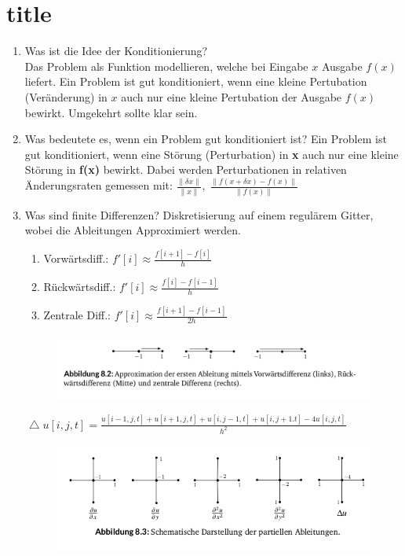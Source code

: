 \documentclass[10pt,a4paper,titlepage]{article}
\begin{document}
\section{title}
\begin{enumerate}[resume=b]
	\item Was ist die Idee der Konditionierung? \\
        Das Problem als Funktion modellieren, welche bei Eingabe $x$ Ausgabe $f(x)$ liefert. Ein Problem ist gut konditioniert, wenn eine kleine Pertubation (Veränderung) in $x$ auch nur eine kleine Pertubation der Ausgabe $f(x)$ bewirkt. Umgekehrt sollte klar sein.

	\item Was bedeutete es, wenn ein Problem gut konditioniert ist?\newline
	Ein Problem ist gut konditioniert, wenn eine Störung (Perturbation) in \textbf{x} auch nur eine kleine Störung in \textbf{f(x)} bewirkt. Dabei werden Perturbationen in relativen Änderungsraten gemessen mit: $\frac{\|\delta x\|}{\|x\|}, \;\frac{\|f(x+\delta x)-f(x)\|}{\|f(x)\|}$ 
	
	\item Was sind finite Differenzen? \newline
	Diskretisierung auf einem regulärem Gitter, wobei die Ableitungen Approximiert werden. \begin{enumerate}
		\item Vorwärtsdiff.: $f'[i]\approx \frac{f[i+1]-f[i]}{h}$
		\item Rückwärtsdiff.: $f'[i]\approx \frac{f[i]-f[i-1]}{h}$
		\item Zentrale Diff.: $f'[i]\approx \frac{f[i+1]-f[i-1]}{2h}$
	\end{enumerate} 
	\begin{figure}[h]    
		\includegraphics[scale=0.3]{Finitvor}
		
	\end{figure}
	$\mathop{\!\mathbin\bigtriangleup} u[i,j,t]=\frac{u[i-1,j,t]+u[i+1,j,t]+u[i,j-1,t]+u[i,j+1.t]-4u[i,j,t]}{h^2}$
	\begin{figure}[h]    
		\includegraphics[scale=0.4]{FiniteDiffs}
		

\end{figure}
\end{enumerate}
\end{document}

